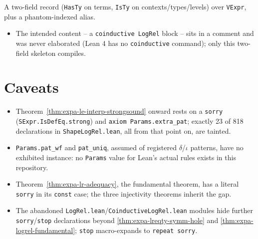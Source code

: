\begin{definition}
\label{structure:expa-coind-classifier}
\leanok
{}

 A two-field record (\texttt{HasTy} on terms, \texttt{IsTy} on contexts/types/levels)
over \texttt{VExpr}, plus a phantom-indexed alias.
\begin{itemize}
\item {} The intended content -- a \texttt{coinductive LogRel} block -- sits in a comment
and was never elaborated (Lean 4 has no \texttt{coinductive} command); only this two-field skeleton
compiles.
\end{itemize}
\end{definition}

\section*{Caveats}
\begin{itemize}
\item Theorem~\ref{thm:expa-le-interp-strongsound} onward rests on a \texttt{sorry}
(\texttt{SExpr.IsDefEq.strong}) and \texttt{axiom Params.extra\_pat}; exactly 23 of 818
declarations in \texttt{ShapeLogRel.lean}, all from that point on, are tainted.
\item \texttt{Params.pat\_wf} and \texttt{pat\_uniq}, assumed of registered $\delta$/$\iota$
patterns, have no exhibited instance: no \texttt{Params} value for Lean's actual rules exists in
this repository.
\item Theorem~\ref{thm:expa-lr-adequacy}, the fundamental theorem, has a literal \texttt{sorry} in
its \texttt{const} case; the three injectivity theorems inherit the gap.
\item The abandoned \texttt{LogRel.lean}/\texttt{CoinductiveLogRel.lean} modules hide further
\texttt{sorry}/\texttt{stop} declarations beyond \ref{thm:expa-lreqty-symm-hole} and
\ref{thm:expa-logrel-fundamental}; \texttt{stop} macro-expands to \texttt{repeat sorry}.
\end{itemize}
